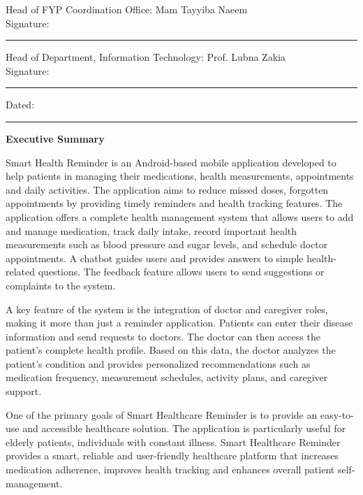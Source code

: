 \documentclass[12pt, a4paper, oneside]{report}
\begin{document}
Head of FYP Coordination Office: Mam Tayyiba Naeem\\
\hfill Signature: \rule{4cm}{0.4pt}

\vspace{1cm}

Head of Department, Information Technology: Prof. Lubna Zakia\\
Signature: \rule{4cm}{0.4pt} \hfill Dated: \rule{3cm}{0.4pt}

\vfill

\newpage
\thispagestyle{empty}
\begin{center}
{\Large\bfseries Executive Summary}
\end{center}
\vspace{0.5cm}

Smart Health Reminder is an Android-based mobile application developed to help patients in managing their medications, health measurements, appointments and daily activities. The application aims to reduce missed doses, forgotten appointments by providing timely reminders and health tracking features. The application offers a complete health management system that allows users to add and manage medication, track daily intake, record important health measurements such as blood pressure and sugar levels, and schedule doctor appointments. A chatbot guides users and provides answers to simple health-related questions. The feedback feature allows users to send suggestions or complaints to the system.

A key feature of the system is the integration of doctor and caregiver roles, making it more than just a reminder application. Patients can enter their disease information and send requests to doctors. The doctor can then access the patient's complete health profile. Based on this data, the doctor analyzes the patient's condition and provides personalized recommendations such as medication frequency, measurement schedules, activity plans, and caregiver support.

One of the primary goals of Smart Healthcare Reminder is to provide an easy-to-use and accessible healthcare solution. The application is particularly useful for elderly patients, individuals with constant illness. Smart Healthcare Reminder provides a smart, reliable and user-friendly healthcare platform that increases medication adherence, improves health tracking and enhances overall patient self-management.
\end{document}
